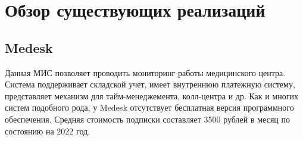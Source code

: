 
%
%
%
%
%



\section{Обзор существующих реализаций}

\subsection*{Medesk}

Данная МИС позволяет проводить мониторинг работы медицинского центра. Система поддерживает складской учет, имеет внутреннюю платежную систему, представляет механизм для тайм-менеджемента, колл-центра и др.
Как и многих систем подобного рода, у Medesk отсутствует бесплатная версия программного обеспечения. Средняя стоимость подписки составляет 3500 рублей в месяц по состоянию на 2022 год.

